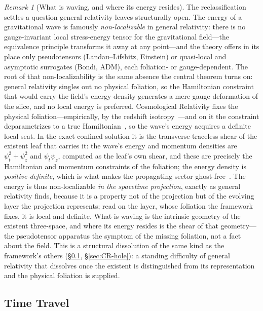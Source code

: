 \documentclass[11pt,a4paper]{article}
\theoremstyle{plain}
\theoremstyle{definition}
\theoremstyle{remark}
\newtheorem{remark}{Remark}
\begin{document}
\begin{remark}[What is waving, and where its energy resides]
The reclassification settles a question general relativity leaves structurally open. The energy of a gravitational wave is famously \emph{non-localizable} in general relativity: there is no gauge-invariant local stress-energy tensor for the gravitational field---the equivalence principle transforms it away at any point---and the theory offers in its place only pseudotensors (Landau--Lifshitz, Einstein) or quasi-local and asymptotic surrogates (Bondi, ADM), each foliation- or gauge-dependent. The root of that non-localizability is the same absence the central theorem turns on: general relativity singles out no physical foliation, so the Hamiltonian constraint that would carry the field's energy density generates a mere gauge deformation of the slice, and no local energy is preferred. Cosmological Relativity fixes the physical foliation---empirically, by the redshift isotropy~\cite{JanzenModernParallax}---and on it the constraint deparametrizes to a true Hamiltonian~\cite{JanzenCanonicalTime}, so the wave's energy acquires a definite local seat. In the exact confined solution it is the transverse-traceless shear of the existent leaf that carries it: the wave's energy and momentum densities are $\psi_t^2+\psi_z^2$ and $\psi_t\psi_z$, computed as the leaf's own shear, and these are precisely the Hamiltonian and momentum constraints of the foliation; the energy density is \emph{positive-definite}, which is what makes the propagating sector ghost-free~\cite{JanzenDynamics}. The energy is thus non-localizable \emph{in the spacetime projection}, exactly as general relativity finds, because it is a property not of the projection but of the evolving layer the projection represents; read on the layer, whose foliation the framework fixes, it is local and definite. What is waving is the intrinsic geometry of the existent three-space, and where its energy resides is the shear of that geometry---the pseudotensor apparatus the symptom of the missing foliation, not a fact about the field. This is a structural dissolution of the same kind as the framework's others (\S\ref{sec:CR-timetravel}, \S\ref{sec:CR-hole}): a standing difficulty of general relativity that dissolves once the existent is distinguished from its representation and the physical foliation is supplied.
\end{remark}

\subsection{Time Travel}\label{sec:CR-timetravel}
\end{document}
